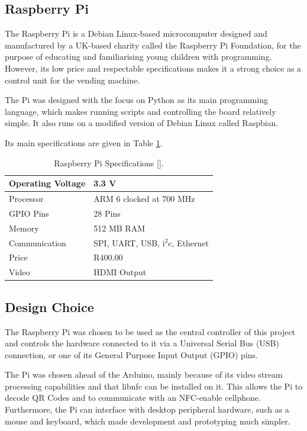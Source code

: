 \subsection{Raspberry Pi}
\label{sec:raspi}

The Raspberry Pi is a Debian Linux-based microcomputer
designed and manufactured by a UK-based charity called the Raspberry Pi Foundation, for the
purpose of educating and familiarising young children with programming. However, its low price
and respectable specifications makes it a strong choice as a control unit for the vending
machine.

The Pi was designed with the focus on Python as its main programming language, which makes
running scripts and controlling the board relatively simple. It also runs on a modified
version of Debian Linux called Raspbian.

Its main specifications are given in Table \ref{tab:rpi-specs}.

\begin{table}
\centering
\caption[Raspberry Pi Specifications.]{Raspberry Pi Specifications
[\cite{website:raspi-specs}].}
  \begin{tabular}{|l|l|}
  \hline
  Operating Voltage & 3.3 V \\\hline
  Processor & ARM 6 clocked at 700 MHz \\\hline
  GPIO Pins & 28 Pins \\\hline
  Memory & 512 MB RAM \\\hline
  Communication & SPI, UART, USB, i$^2$c, Ethernet \\\hline
  Price & R400.00 \\\hline
  Video & HDMI Output \\\hline
  \end{tabular}
  \label{tab:rpi-specs}
\end{table}

\subsection{Design Choice}

The Raspberry Pi was chosen to be used as the central controller of this project and
controls the hardware connected to it via a Universal Serial Bus (USB) connection, or one of
its General Purpose Input Output (GPIO) pins.

The Pi was chosen ahead of the Arduino, mainly because of its video stream processing capabilities 
and that libnfc can be installed on it. This allows the Pi to decode QR Codes and to communicate with 
an NFC-enable cellphone. Furthermore, the Pi can interface with desktop peripheral hardware, such as a mouse and
keyboard, which made development and prototyping much simpler.

